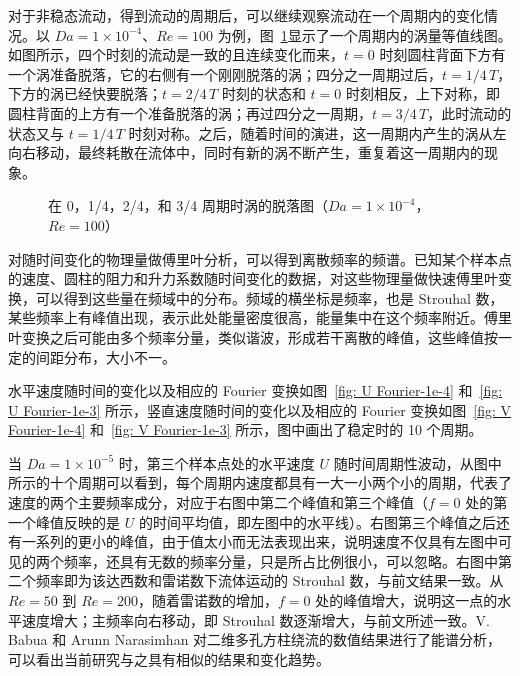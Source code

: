 对于非稳态流动，得到流动的周期后，可以继续观察流动在一个周期内的变化情况。以 $Da=1\times 10^{-4}$、$Re=100$ 为例，图~\ref{fig: 4*vortex}显示了一个周期内的涡量等值线图。如图所示，四个时刻的流动是一致的且连续变化而来，$t=0$ 时刻圆柱背面下方有一个涡准备脱落，它的右侧有一个刚刚脱落的涡；四分之一周期过后，$t=1/4\,T$，下方的涡已经快要脱落；$t=2/4\,T$ 时刻的状态和 $t=0$ 时刻相反，上下对称，即圆柱背面的上方有一个准备脱落的涡；再过四分之一周期，$t=3/4\,T$，此时流动的状态又与 $t=1/4\,T$ 时刻对称。之后，随着时间的演进，这一周期内产生的涡从左向右移动，最终耗散在流体中，同时有新的涡不断产生，重复着这一周期内的现象。

\begin{figure}
	\centering
	\begin{minipage}{\textwidth}
		\centering
	\end{minipage}
	\centering
	\begin{minipage}{\textwidth}
		\centering
	\end{minipage}
	\caption{在 0，1/4，2/4，和 3/4 周期时涡的脱落图（$Da=1\times 10^{-4}$，$Re=100$）}
	\label{fig: 4*vortex}
\end{figure}

对随时间变化的物理量做傅里叶分析，可以得到离散频率的频谱。已知某个样本点的速度、圆柱的阻力和升力系数随时间变化的数据，对这些物理量做快速傅里叶变换，可以得到这些量在频域中的分布。频域的横坐标是频率，也是 Strouhal 数，某些频率上有峰值出现，表示此处能量密度很高，能量集中在这个频率附近。傅里叶变换之后可能由多个频率分量，类似谐波，形成若干离散的峰值，这些峰值按一定的间距分布，大小不一。%

水平速度随时间的变化以及相应的 Fourier 变换如图~\ref{fig: U Fourier-1e-4} 和~\ref{fig: U Fourier-1e-3} 所示，竖直速度随时间的变化以及相应的 Fourier 变换如图~\ref{fig: V Fourier-1e-4} 和~\ref{fig: V Fourier-1e-3} 所示，图中画出了稳定时的 10 个周期。

当 $Da=1\times 10^{-5}$ 时，第三个样本点处的水平速度 $U$ 随时间周期性波动，从图中所示的十个周期可以看到，每个周期内速度都具有一大一小两个小的周期，代表了速度的两个主要频率成分，对应于右图中第二个峰值和第三个峰值（$f=0$ 处的第一个峰值反映的是 $U$ 的时间平均值，即左图中的水平线）。右图第三个峰值之后还有一系列的更小的峰值，由于值太小而无法表现出来，说明速度不仅具有左图中可见的两个频率，还具有无数的频率分量，只是所占比例很小，可以忽略。右图中第二个频率即为该达西数和雷诺数下流体运动的 Strouhal 数，与前文结果一致。从 $Re=50$ 到 $Re=200$，随着雷诺数的增加，$f=0$ 处的峰值增大，说明这一点的水平速度增大；主频率向右移动，即 Strouhal 数逐渐增大，与前文所述一致。V. Babua 和 Arunn Narasimhan \cite{Babu2010} 对二维多孔方柱绕流的数值结果进行了能谱分析，可以看出当前研究与之具有相似的结果和变化趋势。


